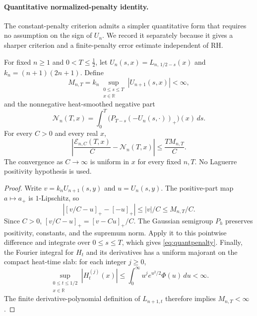 \paragraph{Quantitative normalized-penalty identity.}
The constant-penalty criterion admits a simpler
quantitative form that requires no assumption on
the sign of $U_n$. We record it separately because
it gives a sharper criterion and a finite-penalty
error estimate independent of RH.

\begin{theorem}
\label{thm:quantpenalty}
For fixed $n\ge1$ and $0<T\le\tfrac12$, let
$U_n(s,x)=L_{n,\,1/2-s}(x)$ and
$k_n=(n+1)(2n+1)$. Define
\[
M_{n,T}=k_n\sup_{\substack{0\le s\le T\\x\in\mathbb R}}
 |U_{n+1}(s,x)|<\infty,
\]
and the nonnegative heat-smoothed negative part
\[
\mathcal N_n(T,x)=\int_0^T
 \bigl(P_{T-s}(-U_n(s,\cdot))_+\bigr)(x)\,ds.
\]
For every $C>0$ and every real $x$,
\begin{equation}\label{eq:quantpenalty}
\boxed{
\left|\frac{\mathcal E_{n,C}(T,x)}{C}
      -\mathcal N_n(T,x)\right|
 \le\frac{T M_{n,T}}{C}.}
\end{equation}
The convergence as $C\to\infty$ is uniform
in $x$ for every fixed $n,T$.
No Laguerre positivity hypothesis is used.
\end{theorem}
\begin{proof}
Write $v=k_nU_{n+1}(s,y)$ and $u=U_n(s,y)$.
The positive-part map $a\mapsto a_+$
is $1$-Lipschitz, so
\[
\left|[v/C-u]_+-[-u]_+\right|
\le |v|/C\le M_{n,T}/C.
\]
Since $C>0$,
$[v/C-u]_+=[v-Cu]_+/C$.
The Gaussian semigroup $P_h$ preserves
positivity, constants, and the supremum
norm. Apply it to this pointwise difference
and integrate over $0\le s\le T$,
which gives \eqref{eq:quantpenalty}.
Finally, the Fourier integral for $H_t$
and its derivatives has a uniform
majorant on the compact heat-time slab:
for each integer $j\ge0$,
\[
\sup_{\substack{0\le t\le1/2\\x\in\mathbb R}}
 |H_t^{(j)}(x)|
\le \int_0^\infty
u^j e^{u^2/2}\Phi(u)\,du<\infty.
\]
The finite derivative-polynomial definition
of $L_{n+1,t}$ therefore implies
$M_{n,T}<\infty$.
\end{proof}

